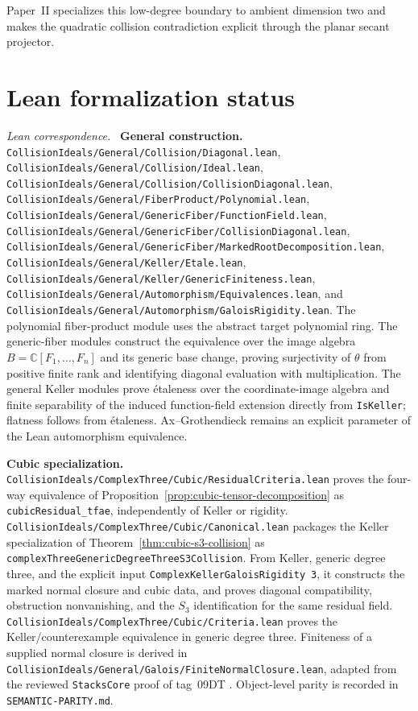 \documentclass[11pt]{article}
\theoremstyle{remark}
\newcommand{\C}{\mathbb C}
\newcommand{\leanpath}[1]{\texttt{\nolinkurl{#1}}}
\newenvironment{leanfiles}
  {\par\medskip\begingroup\footnotesize\raggedright\noindent
   \textit{Lean correspondence.}\ }
  {\par\endgroup\medskip}
\begin{document}
Paper~II specializes this low-degree boundary to ambient dimension two and
makes the quadratic collision contradiction explicit through the planar
secant projector.

\section{Lean formalization status}
\label{sec:lean-status}

\begin{leanfiles}
\textbf{General construction.}
\leanpath{CollisionIdeals/General/Collision/Diagonal.lean},
\leanpath{CollisionIdeals/General/Collision/Ideal.lean},
\leanpath{CollisionIdeals/General/Collision/CollisionDiagonal.lean},
\leanpath{CollisionIdeals/General/FiberProduct/Polynomial.lean},
\leanpath{CollisionIdeals/General/GenericFiber/FunctionField.lean},
\leanpath{CollisionIdeals/General/GenericFiber/CollisionDiagonal.lean},
\leanpath{CollisionIdeals/General/GenericFiber/MarkedRootDecomposition.lean},
\leanpath{CollisionIdeals/General/Keller/Etale.lean},
\leanpath{CollisionIdeals/General/Keller/GenericFiniteness.lean},
\leanpath{CollisionIdeals/General/Automorphism/Equivalences.lean}, and
\leanpath{CollisionIdeals/General/Automorphism/GaloisRigidity.lean}.
The polynomial fiber-product module uses the abstract target polynomial
ring.  The generic-fiber modules construct the equivalence over the image
algebra \(B=\C[F_1,\ldots,F_n]\) and its generic base change, proving
surjectivity of \(\theta\) from positive finite rank and identifying
diagonal evaluation with multiplication.  The general Keller modules prove
\'etaleness over the coordinate-image algebra and finite separability of
the induced function-field extension directly from \leanpath{IsKeller};
flatness follows from \'etaleness.  Ax--Grothendieck remains an explicit
parameter of the Lean automorphism equivalence.

\medskip\noindent\textbf{Cubic specialization.}
\leanpath{CollisionIdeals/ComplexThree/Cubic/ResidualCriteria.lean} proves the
four-way equivalence of Proposition~\ref{prop:cubic-tensor-decomposition}
as \leanpath{cubicResidual_tfae}, independently of Keller or rigidity.
\leanpath{CollisionIdeals/ComplexThree/Cubic/Canonical.lean} packages the
Keller specialization of Theorem~\ref{thm:cubic-s3-collision} as
\leanpath{complexThreeGenericDegreeThreeS3Collision}.
From Keller, generic degree three, and the explicit input
\leanpath{ComplexKellerGaloisRigidity}~\texttt{3}, it constructs the
marked normal closure and cubic data, and proves diagonal compatibility,
obstruction nonvanishing, and the \(S_3\) identification for the same
residual field.
\leanpath{CollisionIdeals/ComplexThree/Cubic/Criteria.lean} proves the
Keller/counterexample equivalence in generic degree three.
Finiteness of a supplied normal closure is derived in
\leanpath{CollisionIdeals/General/Galois/FiniteNormalClosure.lean},
adapted from the reviewed \texttt{StacksCore} proof of tag~09DT
\cite{AxiomStacks2026}.
Object-level parity is recorded in \leanpath{SEMANTIC-PARITY.md}.


\end{leanfiles}
\end{document}
